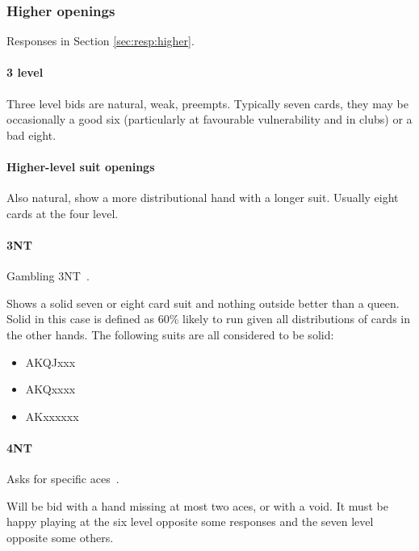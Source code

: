 \documentclass[a4paper,14pt]{extarticle}
\begin{document}
\subsubsection{Higher openings}
\label{sec:open:higher}

Responses in Section \ref{sec:resp:higher}.

\paragraph{3 level}

Three level bids are natural, weak, preempts. Typically seven cards, they may
be occasionally a good six (particularly at favourable vulnerability and in clubs) or a bad eight.

\paragraph{Higher-level suit openings}

Also natural, show a more distributional hand with a longer suit. Usually eight
cards at the four level.

\paragraph{3NT}

Gambling 3NT~. 

Shows a solid seven or eight card suit and nothing outside better than a queen.
Solid in this case is defined as 60\% likely to run given all distributions of
cards in the other hands. The following suits are all considered to be solid:

\begin{itemize}
\item AKQJxxx
\item AKQxxxx
\item AKxxxxxx
\end{itemize}

\paragraph{4NT}

Asks for specific aces~.

Will be bid with a hand missing at most two aces, or with a void. It must be happy playing at the six level opposite some responses and the seven level opposite some others.

\newpage
\end{document}
